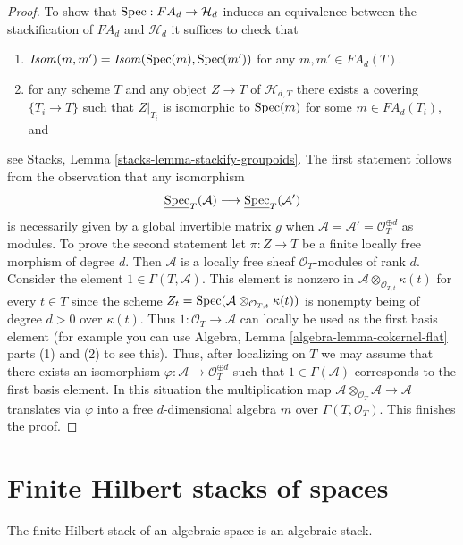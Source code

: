 \begin{proof}
\medskip\noindent
To show that $\mathop{\mathrm{Spec}} : FA_d \to \mathcal{H}_d$ induces an equivalence
between the stackification of $FA_d$ and $\mathcal{H}_d$ it suffices to
check that
\begin{enumerate}
\item $\mathit{Isom}(m, m') = \mathit{Isom}(\mathop{\mathrm{Spec}}(m), \mathop{\mathrm{Spec}}(m'))$
for any $m, m' \in FA_d(T)$.
\item for any scheme $T$ and any object $Z \to T$ of $\mathcal{H}_{d, T}$
there exists a covering $\{T_i \to T\}$ such that $Z|_{T_i}$ is
isomorphic to $\mathop{\mathrm{Spec}}(m)$ for some $m \in FA_d(T_i)$, and
\end{enumerate}
see
Stacks, Lemma \ref{stacks-lemma-stackify-groupoids}.
The first statement follows from the observation that any isomorphism
$$
\underline{\mathop{\mathrm{Spec}}}_T(\mathcal{A})
\longrightarrow
\underline{\mathop{\mathrm{Spec}}}_T(\mathcal{A}')
$$
is necessarily given by a global invertible matrix $g$ when
$\mathcal{A} = \mathcal{A}' = \mathcal{O}_T^{\oplus d}$ as modules.
To prove the second statement let $\pi : Z \to T$ be a finite
locally free morphism of degree $d$. Then $\mathcal{A}$ is a locally
free sheaf $\mathcal{O}_T$-modules of rank $d$.
Consider the element $1 \in \Gamma(T, \mathcal{A})$. This element is
nonzero in $\mathcal{A} \otimes_{\mathcal{O}_{T, t}} \kappa(t)$
for every $t \in T$ since the scheme
$Z_t = \mathop{\mathrm{Spec}}(\mathcal{A} \otimes_{\mathcal{O}_{T, t}} \kappa(t))$
is nonempty being of degree $d > 0$ over $\kappa(t)$. Thus
$1 : \mathcal{O}_T \to \mathcal{A}$ can locally be used as the first
basis element (for example you can use
Algebra, Lemma \ref{algebra-lemma-cokernel-flat} parts (1) and (2)
to see this). Thus, after localizing on
$T$ we may assume that there exists an isomorphism
$\varphi : \mathcal{A} \to \mathcal{O}_T^{\oplus d}$
such that $1 \in \Gamma(\mathcal{A})$ corresponds to the first basis element.
In this situation the multiplication map
$\mathcal{A} \otimes_{\mathcal{O}_T} \mathcal{A} \to \mathcal{A}$
translates via $\varphi$ into a free $d$-dimensional algebra $m$ over
$\Gamma(T, \mathcal{O}_T)$. This finishes the proof.
\end{proof}




\section{Finite Hilbert stacks of spaces}
\label{section-spaces-hilbert}

\noindent
The finite Hilbert stack of an algebraic space is an algebraic stack.

